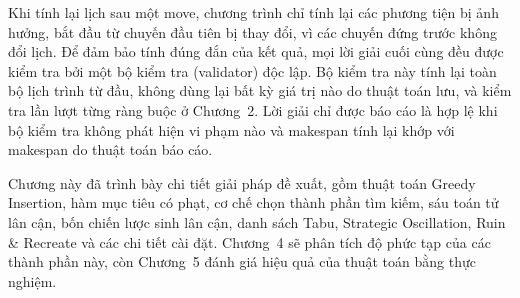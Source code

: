 \documentclass[../DoAn.tex]{subfiles}
\begin{document}
Khi tính lại lịch sau một move, chương trình chỉ tính lại các phương tiện bị ảnh hưởng, bắt đầu từ chuyến đầu tiên bị thay đổi, vì các chuyến đứng trước không đổi lịch. Để đảm bảo tính đúng đắn của kết quả, mọi lời giải cuối cùng đều được kiểm tra bởi một bộ kiểm tra (validator) độc lập. Bộ kiểm tra này tính lại toàn bộ lịch trình từ đầu, không dùng lại bất kỳ giá trị nào do thuật toán lưu, và kiểm tra lần lượt từng ràng buộc ở Chương~2. Lời giải chỉ được báo cáo là hợp lệ khi bộ kiểm tra không phát hiện vi phạm nào và makespan tính lại khớp với makespan do thuật toán báo cáo.

\bigskip
Chương này đã trình bày chi tiết giải pháp đề xuất, gồm thuật toán Greedy Insertion, hàm mục tiêu có phạt, cơ chế chọn thành phần tìm kiếm, sáu toán tử lân cận, bốn chiến lược sinh lân cận, danh sách Tabu, Strategic Oscillation, Ruin \& Recreate và các chi tiết cài đặt. Chương~4 sẽ phân tích độ phức tạp của các thành phần này, còn Chương~5 đánh giá hiệu quả của thuật toán bằng thực nghiệm.
\end{document}
